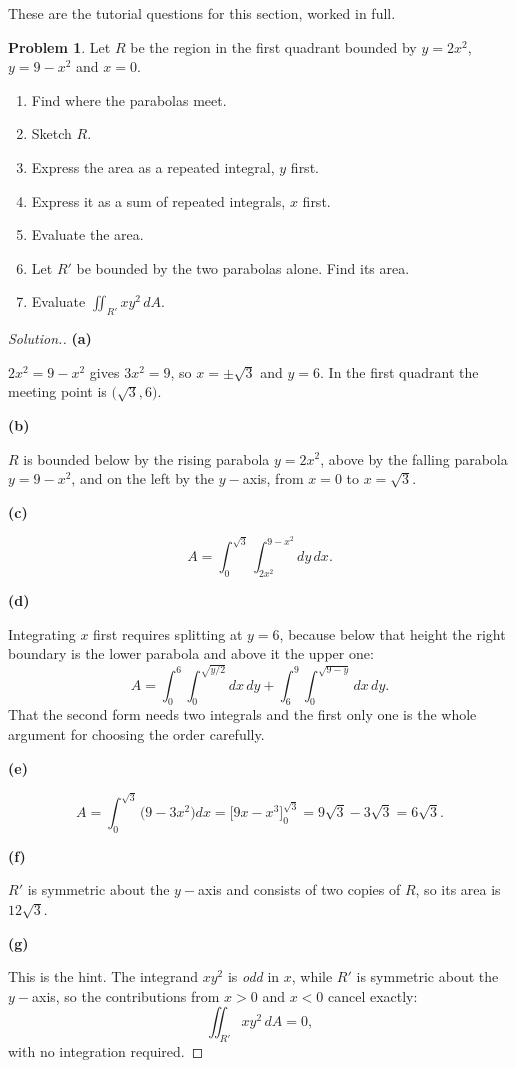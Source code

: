 \documentclass[11pt,a4paper]{article}
\theoremstyle{definition}
\newtheorem{problemx}{Problem}[subsection]
\newenvironment{problem}{\begin{problemx}}{\end{problemx}}
\newenvironment{solution}
  {\renewcommand{\qedsymbol}{}\begin{proof}[\textit{Solution}.]}
  {\end{proof}}
\newcommand{\subhead}[1]{%
  \par\medskip\noindent\textbf{#1}\par\nobreak\smallskip}
\begin{document}
These are the tutorial questions for this section, worked in full.

\begin{problem}
Let $R$ be the region in the first quadrant bounded by $y = 2x^2$,
$y = 9-x^2$ and $x=0$.
\begin{enumerate}
\item[(a)] Find where the parabolas meet.
\item[(b)] Sketch $R$.
\item[(c)] Express the area as a repeated integral, $y$ first.
\item[(d)] Express it as a sum of repeated integrals, $x$ first.
\item[(e)] Evaluate the area.
\item[(f)] Let $R'$ be bounded by the two parabolas alone. Find its area.
\item[(g)] Evaluate $\displaystyle{\iint_{R'}xy^2\,dA}$.
\end{enumerate}
\end{problem}
\begin{solution}
\subhead{(a)}
$2x^2 = 9-x^2$ gives $3x^2 = 9$, so $x = \pm\sqrt3$ and $y = 6$. In the first
quadrant the meeting point is $\big(\sqrt3, 6\big)$.

\subhead{(b)}
$R$ is bounded below by the rising parabola $y=2x^2$, above by the falling
parabola $y = 9-x^2$, and on the left by the $y-$axis, from $x=0$ to
$x=\sqrt3$.

\subhead{(c)}
$$A = \int_0^{\sqrt3}\int_{2x^2}^{9-x^2}dy\,dx .$$

\subhead{(d)}
Integrating $x$ first requires splitting at $y=6$, because below that height the
right boundary is the lower parabola and above it the upper one:
$$A = \int_0^6\int_0^{\sqrt{y/2}}dx\,dy
+ \int_6^9\int_0^{\sqrt{9-y}}dx\,dy .$$
That the second form needs two integrals and the first only one is the whole
argument for choosing the order carefully.

\subhead{(e)}
$$A = \int_0^{\sqrt3}\big(9-3x^2\big)dx
= \Big[9x - x^3\Big]_0^{\sqrt3} = 9\sqrt3 - 3\sqrt3 = 6\sqrt3 .$$

\subhead{(f)}
$R'$ is symmetric about the $y-$axis and consists of two copies of $R$, so its
area is $12\sqrt3$.

\subhead{(g)}
This is the hint. The integrand $xy^2$ is \emph{odd} in $x$, while $R'$ is
symmetric about the $y-$axis, so the contributions from $x>0$ and $x<0$ cancel
exactly:
$$\iint_{R'}xy^2\,dA = 0 ,$$
with no integration required.
\end{solution}
\end{document}
